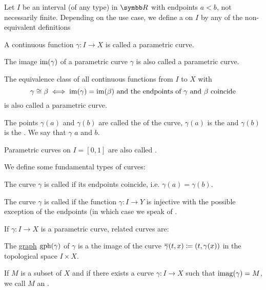 \begin{Definition}\label{def:parametric_curve}
   Let \( I \) be an interval (of any type) in \( \BR \) with endpoints \( a < b \), not necessarily finite. Depending on the use case, we define a  on \( I \) by any of the non-equivalent definitions

  \begin{DefEnum}
     A continuous function \( \gamma: I \to X \) is called a parametric curve.

     The image \( \operatorname{im}(\gamma) \) of a parametric curve \( \gamma \) is also called a parametric curve.

     The equivalence class of all continuous functions from \( I \) to \( X \) with
    \begin{equation*}
      \gamma \cong \beta \iff \operatorname{im}(\gamma) = \operatorname{im}(\beta) \text{ and the endpoints of } \gamma \text{ and } \beta \text{ coincide}
    \end{equation*}
    is also called a parametric curve.
  \end{DefEnum}

  The points \( \gamma(a) \) and \( \gamma(b) \) are called the  of the curve, \( \gamma(a) \) is the  and \( \gamma(b) \) is the . We say that \( \gamma \)  \( a \) and \( b \).

  Parametric curves on \( I = [0, 1] \) are also called .

  We define some fundamental types of curves:
  \begin{DefEnum}
     The curve \( \gamma \) is called  if its endpoints coincide, i.e. \( \gamma(a) = \gamma(b) \).

     The curve \( \gamma \) is called  if the function \( \gamma: I \to Y \) is injective with the possible exception of the endpoints (in which case we speak of .
  \end{DefEnum}

  If \( \gamma: I \to X \) is a parametric curve, related curves are:
  \begin{DefEnum}
    \cite[definition 1.20]{Иванов2017} The \hyperref[def:function/graph]{graph} \( \operatorname{gph}(\gamma) \) of \( \gamma \) is a the image of the curve \( \overline{\gamma}(t, x) \coloneqq (t, \gamma(x)) \) in the topological space \( I \times X \).

    \cite[definition 1.24]{Иванов2017} If \( M \) is a subset of \( X \) and if there exists a curve \( \gamma: I \to X \) such that \( \operatorname{imag}(\gamma) = M \), we call \( M \) an .
  \end{DefEnum}
\end{Definition}

